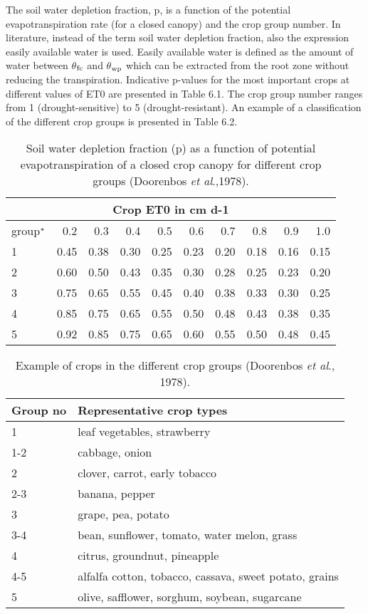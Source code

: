 The soil water depletion fraction, p, is a function of the potential evapotranspiration rate 
(for a closed canopy) and the crop group  number. 
In literature, instead of the term soil water depletion fraction, also the 
expression easily available water is used. Easily available water is defined as the amount of
water between $\theta$$_{{\rm fc}}$ and $\theta$$_{{\rm wp}}$ which can be extracted from the root 
zone without reducing the
transpiration. Indicative p-values for the most important crops at different values of ET0
are presented in Table 6.1. The crop group number ranges from 1 (drought-sensitive) to 5
(drought-resistant). An example of a classification of the different crop groups is
presented in Table 6.2.

\begin{table}
	\caption{Soil water depletion fraction (p) as a function of potential evapotranspiration 
		of a closed crop canopy for different crop groups (Doorenbos {\it et al}.,1978).}
	\label{tbl:soilwatdeplfraction}
	\begin{tabularx}{\textwidth}{Xrrrrrrrrr}
		\hline
		\multicolumn{10}{c}{Crop ET0 in cm d-1}\\
		\hline
		group$^{\rm *}$ & 0.2 & 0.3 & 0.4 & 0.5 & 0.6 & 0.7 & 0.8 & 0.9 & 1.0\\
		1 & 0.45 & 0.38 & 0.30 & 0.25 & 0.23 & 0.20 & 0.18 & 0.16 & 0.15\\
		2 & 0.60 & 0.50 & 0.43 & 0.35 & 0.30 & 0.28 & 0.25 & 0.23 & 0.20\\
		3 & 0.75 & 0.65 & 0.55 & 0.45 & 0.40 & 0.38 & 0.33 & 0.30 & 0.25\\
		4 & 0.85 & 0.75 & 0.65 & 0.55 & 0.50 & 0.48 & 0.43 & 0.38 & 0.35\\
		5 & 0.92 & 0.85 & 0.75 & 0.65 & 0.60 & 0.55 & 0.50 & 0.48 & 0.45\\
		\hline 
	\end{tabularx} 
\end{table}


\begin{table}
	\caption{Example of crops in the different crop groups (Doorenbos {\it et al}., 1978).}
	\label{tbl:ExampleCropGroups}
	\begin{tabularx}{\textwidth}{lX}
		\hline
		Group no & Representative crop types\\
		\hline
		1 & leaf vegetables, strawberry\\     
		1-2 & cabbage, onion\\
		2 & clover, carrot, early tobacco\\     
		2-3 & banana, pepper\\
		3 & grape, pea, potato\\
		3-4 & bean, sunflower, tomato, water melon, grass\\
		4 & citrus, groundnut, pineapple\\
		4-5 & alfalfa cotton, tobacco, cassava, sweet potato, grains\\
		5 & olive, safflower, sorghum, soybean, sugarcane\\
		\hline
	\end{tabularx}
\end{table}

